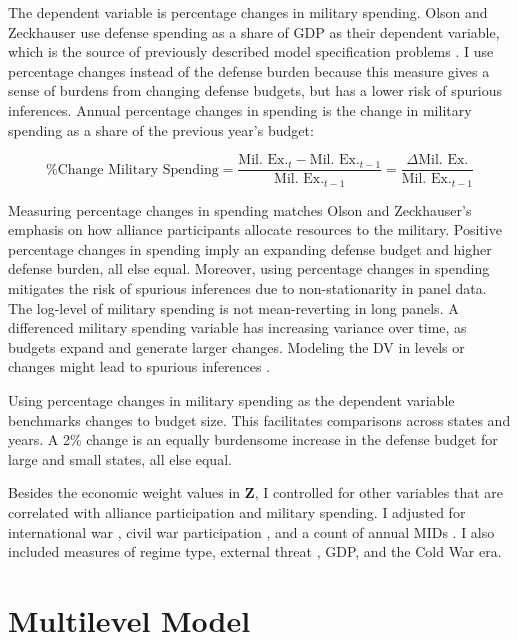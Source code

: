 \documentclass[12pt]{article}
\begin{document}
The dependent variable is percentage changes in military spending. 
Olson and Zeckhauser use defense spending as a share of GDP as their dependent variable, which is the source of previously described model specification problems \citep{PluemperNeumayer2015}. 
I use percentage changes instead of the defense burden because this measure gives a sense of burdens from changing defense budgets, but has a lower risk of spurious inferences. 
Annual percentage changes in spending is the change in military spending as a share of the previous year's budget:


\begin{equation}
\mbox{\% Change Military Spending} = \frac{\mbox{Mil. Ex.}_t - \mbox{Mil. Ex.}_{t-1} }{ \mbox{Mil. Ex.}_{t-1} } = \frac{\Delta \mbox{Mil. Ex.} }{ \mbox{Mil. Ex.}_{t-1} }
\end{equation} 


Measuring percentage changes in spending matches Olson and Zeckhauser's emphasis on how alliance participants allocate resources to the military.
Positive percentage changes in spending imply an expanding defense budget and higher defense burden, all else equal.
Moreover, using percentage changes in spending mitigates the risk of spurious inferences due to non-stationarity in panel data. 
The log-level of military spending is not mean-reverting in long panels.
A differenced military spending variable has increasing variance over time, as budgets expand and generate larger changes. 
Modeling the DV in levels or changes might lead to spurious inferences \citep{GrangerNewbold1974}. 


Using percentage changes in military spending as the dependent variable benchmarks changes to budget size. 
This facilitates comparisons across states and years. 
A 2\% change is an equally burdensome increase in the defense budget for large and small states, all else equal. 


Besides the economic weight values in \textbf{Z}, I controlled for other variables that are correlated with alliance participation and military spending. 
I adjusted for international war \citep{Reiteretal2016}, civil war participation \citep{SarkeesWayman2010}, and a count of annual MIDs \citep{Gibleretal2016}. 
I also included measures of regime type, external threat \citep{LeedsSavun2007}, GDP, and the Cold War era. 

 


\section{Multilevel Model}
\end{document}

